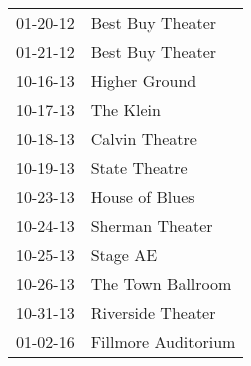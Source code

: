 \begin{supertabular}{p{0.07\textwidth}p{0.23\textwidth}}
 01-20-12 &     Best Buy Theater \\
 01-21-12 &     Best Buy Theater \\
 10-16-13 &        Higher Ground \\
 10-17-13 &            The Klein \\
 10-18-13 &       Calvin Theatre \\
 10-19-13 &        State Theatre \\
 10-23-13 &       House of Blues \\
 10-24-13 &      Sherman Theater \\
 10-25-13 &             Stage AE \\
 10-26-13 &    The Town Ballroom \\
 10-31-13 &    Riverside Theater \\
 01-02-16 &  Fillmore Auditorium \\
\end{supertabular}
